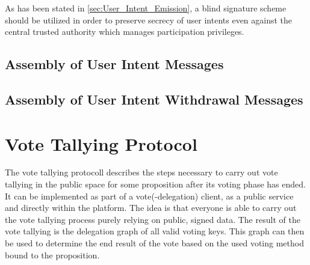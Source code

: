 As has been stated in \autoref{sec:User_Intent_Emission}, a blind signature scheme should be utilized in order to preserve secrecy of user intents even against the central trusted authority which manages participation privileges.

\subsection{Assembly of User Intent Messages}


\subsection{Assembly of User Intent Withdrawal Messages}







\section{Vote Tallying Protocol}
\label{sec:VoteTallyingProtocol}
The vote tallying protocoll describes the steps necessary to carry out vote tallying in the public space for some proposition after its voting phase has ended.
It can be implemented as part of a vote(-delegation) client, as a public service and directly within the platform.
The idea is that everyone is able to carry out the vote tallying process purely relying on public, signed data.
The result of the vote tallying is the delegation graph of all valid voting keys.
This graph can then be used to determine the end result of the vote based on the used voting method bound to the proposition.




